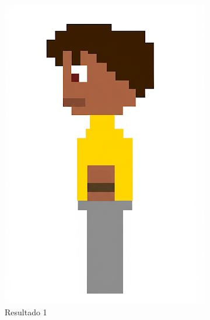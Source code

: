 \begin{figure}[htbp]
\begin{subfigure}{0.23\linewidth}
        \includegraphics[width=1\linewidth]{figs/geminiPro/chat6/tela2_res1.png}
        \caption{\small Resultado 1}
        \label{fig:geminiPro18a}
    \end{subfigure}
    \begin{subfigure}{0.23\linewidth}

\end{subfigure}
\end{figure}
